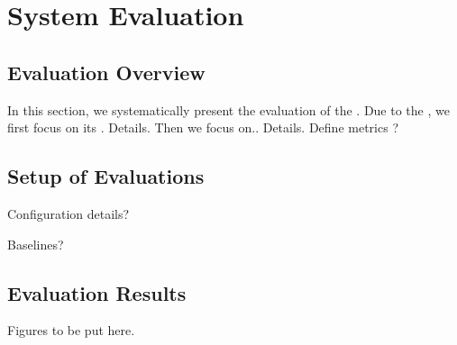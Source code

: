 \section{System Evaluation}
\label{evaluation}

\subsection{Evaluation Overview}

In this section, we systematically present the evaluation of the . Due to the , we first focus on its . Details. Then we focus on.. Details.
Define metrics
 ?


\subsection{Setup of Evaluations}

Configuration details?

Baselines?

\subsection{Evaluation Results}
 
Figures to be put here. 
